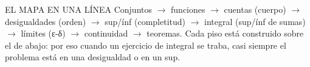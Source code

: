 \begin{tip}{EL MAPA EN UNA LÍNEA}
Conjuntos $\to$ funciones $\to$ cuentas (cuerpo) $\to$ desigualdades (orden) $\to$ sup/ínf (completitud) $\to$ integral (sup/ínf de sumas) $\to$ límites (ε-δ) $\to$ continuidad $\to$ teoremas. Cada piso está construido sobre el de abajo: por eso cuando un ejercicio de integral se traba, casi siempre el problema está en una desigualdad o en un sup.
\end{tip}
